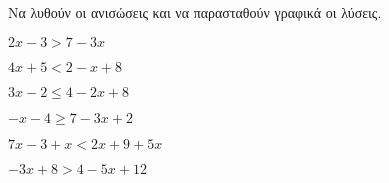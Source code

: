 Να λυθούν οι ανισώσεις και να παρασταθούν γραφικά οι λύσεις.
\begin{multicols}{3}
\begin{alist}
\item $ 2x-3>7-3x $
\item $ 4x+5<2-x+8 $
\item $ 3x-2\leq4-2x+8 $
\item $ -x-4\geq7-3x+2 $
\item $ 7x-3+x<2x+9+5x $
\item $ -3x+8>4-5x+12 $
\end{alist}
\end{multicols}
